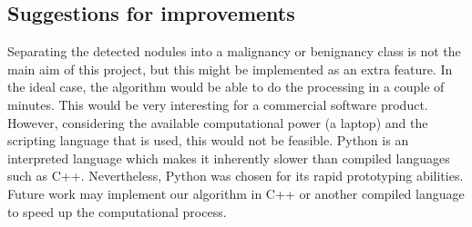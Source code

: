 
\subsection{Suggestions for improvements}
Separating the detected nodules into a malignancy or benignancy class is not the
main aim of this project, but this might be implemented as an extra feature.
In the ideal case, the algorithm would be able to do the processing in a couple
of minutes. This would be very interesting for a commercial software product.
However, considering the available computational power (a laptop) and the
scripting language that is used, this would not be feasible. Python is an
interpreted language which makes it inherently slower than compiled languages
such as C++. Nevertheless, Python was chosen for its rapid prototyping
abilities. Future work may implement our algorithm in C++ or another compiled
language to speed up the computational process.





